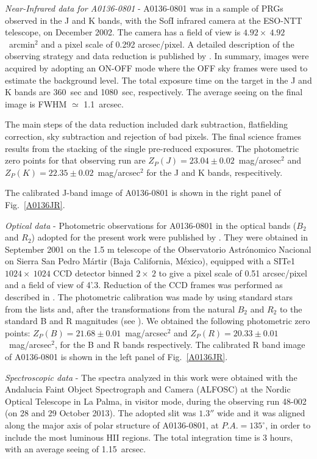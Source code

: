 \documentclass[useAMS,usenatbib]{mn2e}
\begin{document}
{\it Near-Infrared data for A0136-0801} - A0136-0801 was in a sample
of PRGs observed in the J and K bands, with the SofI infrared camera
at the ESO-NTT telescope, on December 2002. The camera has a field of
view is $4.92 \times\ 4.92$~arcmin$^{2}$ and a pixel scale of 0.292
arcsec/pixel. A detailed description of the observing strategy and
data reduction is published by \citet{Spav13}. In summary, images were
acquired by adopting an ON-OFF mode where the OFF sky frames were used
to estimate the background level. The total exposure time on the
target in the J and K bands are 360~sec and 1080~sec,
respectively. The average seeing on the final image is FWHM $\simeq$
1.1~arcsec.

The main steps of the data reduction included dark subtraction,
flatfielding correction, sky subtraction and rejection of bad
pixels. The final science frames results from the stacking of the
single pre-reduced exposures. The photometric zero points for that
observing run are $Z_{P}(J) = 23.04 \pm 0.02$~mag/arcsec$^{2}$ and
$Z_{P}(K) = 22.35 \pm 0.02$~mag/arcsec$^{2}$ for the J and K bands,
respecitively.

The calibrated J-band image of A0136-0801 is shown in the right panel of Fig.~\ref{A0136JR}.

{\it Optical data} - Photometric observations for A0136-0801 in the optical bands ($B_{2}$ and
$R_{2}$) adopted for the present work were published by \citet{Godinez07}. They were 
obtained in September 2001 on the 1.5 m telescope
of the Observatorio Astr{\'o}nomico Nacional on Sierra San Pedro
M{\'a}rtir (Baja California, M{\'e}xico), equipped with a SITe1 $1024
\times\ 1024$ CCD detector binned $2 \times\ 2$ to give a pixel scale
of 0.51 arcsec/pixel and a field of view of 4'.3. Reduction of the
CCD frames was performed as described in \citet{Godinez07}. The
photometric calibration was made by using standard stars from the
\citet{Lan83} lists and, after the transformations from the natural
$B_{2}$ and $R_{2}$ to the standard B and R magnitudes (see
\citealt{Godinez07}). We obtained the following photometric zero
points: $Z_{P}(B) = 21.68 \pm 0.01$~mag/arcsec$^{2}$ and $Z_{P}(R) =20.33 \pm 0.01$~mag/arcsec$^{2}$, for the B and R bands respectively.
The calibrated R band image of A0136-0801 is shown in the left panel of Fig.~\ref{A0136JR}. 

{\it Spectroscopic data} - The spectra analyzed in this work were
obtained with the Andalucia Faint Object Spectrograph and
Camera (ALFOSC) at the Nordic Optical Telescope in La Palma, in visitor mode, during the observing run 48-002 (on 28 and 29 October 2013). The adopted slit was $1.3''$ wide and it was aligned
along the major axis of polar structure of A0136-0801, at $P.A. = 135^{\circ}$, in
order to include the most luminous HII regions. The total integration time is 3 hours, with an average seeing of 1.15~arcsec.
\end{document}
